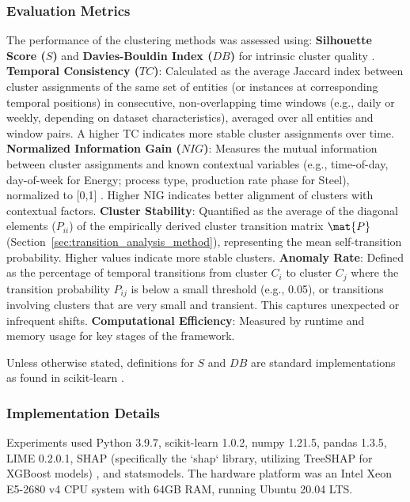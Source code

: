 \documentclass[final,authoryear,3p,times,review,sort&compress]{elsarticle}
\begin{document}
\subsubsection{Evaluation Metrics}
\label{sec:evaluation_metrics}
The performance of the clustering methods was assessed using:
\textbf{Silhouette Score ($S$)} and \textbf{Davies-Bouldin Index ($DB$)} for intrinsic cluster quality \citep{rousseeuw1987silhouettes}.
\textbf{Temporal Consistency ($TC$)}: Calculated as the average Jaccard index between cluster assignments of the same set of entities (or instances at corresponding temporal positions) in consecutive, non-overlapping time windows (e.g., daily or weekly, depending on dataset characteristics), averaged over all entities and window pairs. A higher TC indicates more stable cluster assignments over time.
\textbf{Normalized Information Gain ($NIG$)}: Measures the mutual information between cluster assignments and known contextual variables (e.g., time-of-day, day-of-week for Energy; process type, production rate phase for Steel), normalized to [0,1] \citep{strehl2002relationship}. Higher NIG indicates better alignment of clusters with contextual factors.
\textbf{Cluster Stability}: Quantified as the average of the diagonal elements ($P_{ii}$) of the empirically derived cluster transition matrix $\mat{P}$ (Section~\ref{sec:transition_analysis_method}), representing the mean self-transition probability. Higher values indicate more stable clusters.
\textbf{Anomaly Rate}: Defined as the percentage of temporal transitions from cluster $C_i$ to cluster $C_j$ where the transition probability $P_{ij}$ is below a small threshold (e.g., 0.05), or transitions involving clusters that are very small and transient. This captures unexpected or infrequent shifts.
\textbf{Computational Efficiency}: Measured by runtime and memory usage for key stages of the framework.

Unless otherwise stated, definitions for $S$ and $DB$ are standard implementations as found in scikit-learn \citep{kramer2016scikit}.

\subsubsection{Implementation Details}
\label{sec:implementation_details}
Experiments used Python 3.9.7, scikit-learn 1.0.2, numpy 1.21.5, pandas 1.3.5, LIME 0.2.0.1, SHAP (specifically the `shap` library, utilizing TreeSHAP for XGBoost models) \citep{van2022tractability, garreau2020explaining}, and statsmodels. The hardware platform was an Intel Xeon E5-2680 v4 CPU system with 64GB RAM, running Ubuntu 20.04 LTS.
\end{document}
